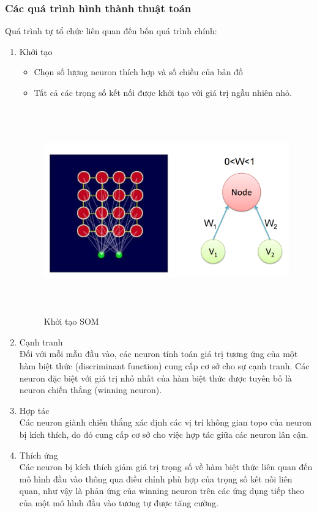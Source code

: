    \subsubsection{Các quá trình hình thành thuật toán}
   	 Quá trình tự tổ chức liên quan đến bốn quá trình chính:
   	 \begin{enumerate}
   	 \item Khởi tạo
   	 \begin{itemize}
   	   \item Chọn số lượng neuron thích hợp và số chiều của bản đồ   
   	   \item Tất cả các trọng số kết nối được khởi tạo với giá trị ngẫu nhiên
   	   nhỏ.
   	 \end{itemize}
   	 \begin{figure}[h!]
  	    \centering
	    \includegraphics[width=5.5in,height=3.5in,keepaspectratio=true]{SOM2.png}
	    \caption{Khởi tạo SOM}
     \end{figure}
     \item Cạnh tranh\\
     Đối với mỗi mẫu đầu vào, các neuron tính toán giá trị tương ứng của một hàm biệt thức (discriminant function) cung cấp cơ sở cho sự cạnh tranh. Các neuron đặc biệt với giá trị nhỏ nhất của hàm biệt thức được tuyên bố là neuron chiến thắng (winning neuron).
     \item Hợp tác\\
     Các neuron giành chiến thắng xác định các vị trí không gian topo của neuron bị kích thích, do đó cung cấp cơ sở cho việc hợp tác giữa các neuron lân cận.
     \item Thích ứng\\
   	   Các neuron bị kích thích giảm giá trị trọng số về hàm biệt thức liên quan đến mô hình đầu vào thông qua điều chỉnh phù hợp của trọng số kết nối liên quan, như vậy là phản ứng của winning neuron trên các ứng dụng tiếp theo của một mô hình đầu vào tương tự được tăng cường.
   	 \end{enumerate}
